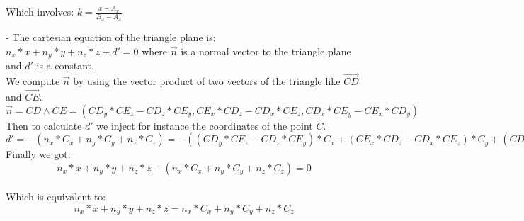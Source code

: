 \documentclass{article}
\begin{document}
    Which involves: $k = \frac{x - A_x}{B_x - A_x}$
    
    
    - The cartesian equation of the triangle plane is:\\
    $n_x * x + n_y * y + n_z * z + d' = 0$ where $\vec{n}$ is a normal vector to the triangle plane and $d'$ is a constant.\\
    We compute $\vec{n}$ by using the vector product of two vectors of the triangle like $\overrightarrow{CD}$ and $\overrightarrow{CE}$.\\
    $\vec{n} = CD \wedge CE = (CD_y * CE_z - CD_z * CE_y, CE_x * CD_z - CD_x * CE_z, CD_x * CE_y - CE_x * CD_y)$\\
    Then to calculate $d'$ we inject for instance the coordinates of the point $C$.\\
    $d' = -(n_x * C_x + n_y * C_y + n_z * C_z) = -((CD_y * CE_z - CD_z * CE_y) * C_x + (CE_x * CD_z - CD_x * CE_z) * C_y + (CD_x * CE_y - CE_x * CD_y) * C_z)$\\
    Finally we got: $$n_x * x + n_y * y + n_z * z - (n_x * C_x + n_y * C_y + n_z * C_z) = 0$$\\
		Which is equivalent to:\\
    $$n_x * x + n_y * y + n_z * z = n_x * C_x + n_y * C_y + n_z * C_z$$\\
		
\end{document}
